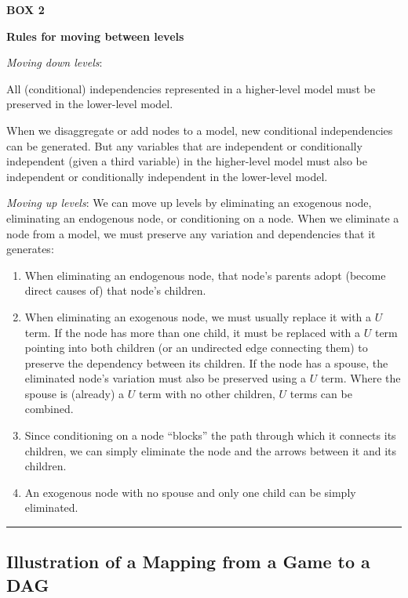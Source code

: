 \documentclass[
  12pt,
]{book}
\providecommand{\tightlist}{%
  \setlength{\itemsep}{0pt}\setlength{\parskip}{0pt}}
\begin{document}
\textbf{BOX 2}

\textbf{Rules for moving between levels}

\emph{Moving down levels}:

All (conditional) independencies represented in a higher-level model must be preserved in the lower-level model.

When we disaggregate or add nodes to a model, new conditional independencies can be generated. But any variables that are independent or conditionally independent (given a third variable) in the higher-level model must also be independent or conditionally independent in the lower-level model.

\emph{Moving up levels}: We can move up levels by eliminating an exogenous node, eliminating an endogenous node, or conditioning on a node. When we eliminate a node from a model, we must preserve any variation and dependencies that it generates:

\begin{enumerate}
\def\labelenumi{\arabic{enumi}.}
\tightlist
\item
  When eliminating an endogenous node, that node's parents adopt (become direct causes of) that node's children.
\item
  When eliminating an exogenous node, we must usually replace it with a \(U\) term. If the node has more than one child, it must be replaced with a \(U\) term pointing into both children (or an undirected edge connecting them) to preserve the dependency between its children. If the node has a spouse, the eliminated node's variation must also be preserved using a \(U\) term. Where the spouse is (already) a \(U\) term with no other children, \(U\) terms can be combined.\\
\item
  Since conditioning on a node ``blocks'' the path through which it connects its children, we can simply eliminate the node and the arrows between it and its children.
\item
  An exogenous node with no spouse and only one child can be simply eliminated.
\end{enumerate}

\begin{center}\rule{0.5\linewidth}{0.5pt}\end{center}

\hypertarget{illustration-of-a-mapping-from-a-game-to-a-dag}{%
\subsection{Illustration of a Mapping from a Game to a DAG}\label{illustration-of-a-mapping-from-a-game-to-a-dag}}
\end{document}
